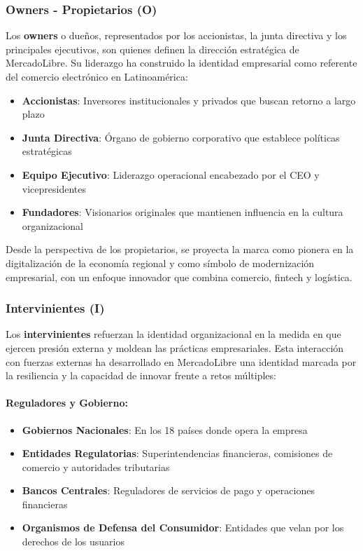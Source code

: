 \subsubsection{Owners - Propietarios (O)}

Los \textbf{owners} o dueños, representados por los accionistas, la junta directiva y los principales ejecutivos, son quienes definen la dirección estratégica de MercadoLibre. Su liderazgo ha construido la identidad empresarial como referente del comercio electrónico en Latinoamérica:

\begin{itemize}
\item \textbf{Accionistas}: Inversores institucionales y privados que buscan retorno a largo plazo
\item \textbf{Junta Directiva}: Órgano de gobierno corporativo que establece políticas estratégicas
\item \textbf{Equipo Ejecutivo}: Liderazgo operacional encabezado por el CEO y vicepresidentes
\item \textbf{Fundadores}: Visionarios originales que mantienen influencia en la cultura organizacional
\end{itemize}

Desde la perspectiva de los propietarios, se proyecta la marca como pionera en la digitalización de la economía regional y como símbolo de modernización empresarial, con un enfoque innovador que combina comercio, fintech y logística.

\subsubsection{Intervinientes (I)}

Los \textbf{intervinientes} refuerzan la identidad organizacional en la medida en que ejercen presión externa y moldean las prácticas empresariales. Esta interacción con fuerzas externas ha desarrollado en MercadoLibre una identidad marcada por la resiliencia y la capacidad de innovar frente a retos múltiples:

\paragraph{Reguladores y Gobierno:}
\begin{itemize}
\item \textbf{Gobiernos Nacionales}: En los 18 países donde opera la empresa
\item \textbf{Entidades Regulatorias}: Superintendencias financieras, comisiones de comercio y autoridades tributarias
\item \textbf{Bancos Centrales}: Reguladores de servicios de pago y operaciones financieras
\item \textbf{Organismos de Defensa del Consumidor}: Entidades que velan por los derechos de los usuarios
\end{itemize}

